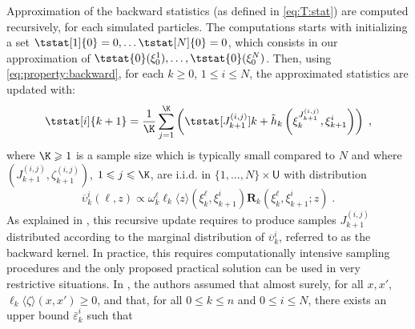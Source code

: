 \documentclass{article}
\newcommand{\af}[1]{h_{#1}}
\newcommand{\addf}[1]{\termletter_{#1}}
\newcommand{\termletter}{\tilde{h}}
\newcommand{\N}{N}
\newcommand{\hkup}{\bar{\varepsilon}}
\newcommand{\bi}[3]{J_{#1}^{(#2, #3)}}
\newcommand{\eqsp}{\;}
\newcommand{\ewght}[2]{\ensuremath{\omega_{#1}^{#2}}}
\newcommand{\epart}[2]{\ensuremath{\xi_{#1}^{#2}}}
\newcommand{\marginalset}{\mathsf{U}}
\newcommand{\kernelmarg}{\mathbf{R}}
\newcommand{\hatqg}[1]{\mathsf{\ell}_{#1}}
\begin{document}
Approximation of the backward statistics (as defined in \eqref{eq:T:stat}) are computed recursively, for each simulated particles. 
The computations starts with initializing a set $\tstat[1]{0} = 0,\dots \tstat[N]{0} = 0$, which consists in our approximation of $\tstat{0}(\epart{0}{1}), \dots, \tstat{0}(\epart{0}{N})$.  Then, using \eqref{eq:property:backward}, for each $k\geqslant 0$, $1\leqslant i\leqslant \N$, the approximated statistics are updated with:
\begin{equation}
\label{eq:update:paris:marginal}
\tstat[i]{k+1}  = \frac{1}{\K} \sum_{j=1}^{\K} \left( \tstat[\bi{k+1}{i}{j}]{k} + \addf{k}\left(\epart{k}{\bi{k+1}{i}{j}}, \epart{k+1}{i}\right)\right)\eqsp,
\end{equation}
where $\K\geqslant 1$ is a sample size which  is typically small compared to $\N$ and where $(\bi{k+1}{i}{j},\zeta_{k+1}^{(i,j)})$, $1\leqslant j\leqslant \K$, are i.i.d. in $\{1,\ldots,\N\}\times\marginalset$ with distribution 
$$
\overline \upsilon_k^i(\ell,z)\propto\ewght{k}{\ell}\hatqg{k}\langle z\rangle(\epart{k}{\ell},\epart{k+1}{i})\kernelmarg_{k}(\epart{k}{\ell},\epart{k+1}{i};z)\eqsp.
$$
As explained in \cite{gloaguen2021pseudo}, this recursive update requires to produce samples $\bi{k+1}{i}{j}$ distributed according to the marginal  distribution of $\overline \upsilon_k^i$, referred to as the backward kernel. In practice, this requires computationally intensive sampling procedures and the only proposed practical solution can be used in very restrictive situations.  
In \cite{gloaguen2018online}, the authors assumed that  almost surely, for all $x,x'$, $\hatqg{k}\langle \zeta\rangle(x, x')\geqslant 0$, and that, for all  $0\leqslant k\leqslant n$ and $0\leqslant i\leqslant N$, there exists an upper bound $\hkup^i_k$  such that
\end{document}
